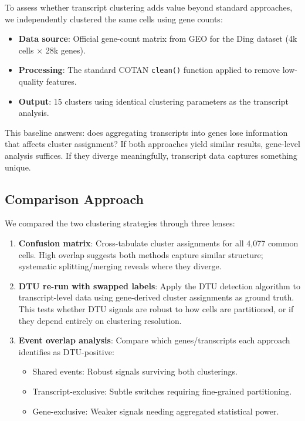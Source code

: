To assess whether transcript clustering adds value beyond standard approaches, we independently clustered the same cells using gene counts:

\begin{itemize}
    \item \textbf{Data source}: Official gene-count matrix from GEO for the Ding dataset (4k cells $\times$ 28k genes).
    \item \textbf{Processing}: The standard COTAN \texttt{clean()} function applied to remove low-quality features.
    \item \textbf{Output}: 15 clusters using identical clustering parameters as the transcript analysis.
\end{itemize}

This baseline answers: does aggregating transcripts into genes lose information that affects cluster assignment? If both approaches yield similar results, gene-level analysis suffices. If they diverge meaningfully, transcript data captures something unique.

\subsection*{Comparison Approach}

We compared the two clustering strategies through three lenses:

\begin{enumerate}
    \item \textbf{Confusion matrix}: Cross-tabulate cluster assignments for all 4,077 common cells. High overlap suggests both methods capture similar structure; systematic splitting/merging reveals where they diverge.
    \item \textbf{DTU re-run with swapped labels}: Apply the DTU detection algorithm to transcript-level data using gene-derived cluster assignments as ground truth. This tests whether DTU signals are robust to how cells are partitioned, or if they depend entirely on clustering resolution.
    \item \textbf{Event overlap analysis}: Compare which genes/transcripts each approach identifies as DTU-positive:
    \begin{itemize}
        \item Shared events: Robust signals surviving both clusterings.
        \item Transcript-exclusive: Subtle switches requiring fine-grained partitioning.
        \item Gene-exclusive: Weaker signals needing aggregated statistical power.
    \end{itemize}
\end{enumerate}

